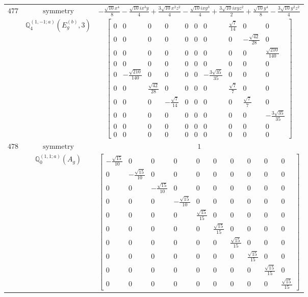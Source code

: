 \documentclass[fleqn,8pt,landscape]{jsarticle}
\begin{document}
\begin{longtable}{ccc}
$ 477 $ & $ \text{symmetry} $ & $ - \frac{\sqrt{10} x^{4}}{8} - \frac{\sqrt{10} i x^{3} y}{4} + \frac{3 \sqrt{10} x^{2} z^{2}}{4} - \frac{\sqrt{10} i x y^{3}}{4} + \frac{3 \sqrt{10} i x y z^{2}}{2} + \frac{\sqrt{10} y^{4}}{8} - \frac{3 \sqrt{10} y^{2} z^{2}}{4} $ \\
$  $ & $ \mathbb{Q}_{4}^{(1,-1;a)}(E_{g}^{(b)},3) $ & $ \begin{bmatrix} 0 & 0 & 0 & 0 & 0 & 0 & 0 & \frac{\sqrt{7}}{14} & 0 & 0 \\ 0 & 0 & 0 & 0 & 0 & 0 & 0 & 0 & - \frac{\sqrt{42}}{28} & 0 \\ 0 & 0 & 0 & 0 & 0 & 0 & 0 & 0 & 0 & \frac{\sqrt{210}}{140} \\ 0 & 0 & 0 & 0 & 0 & 0 & 0 & 0 & 0 & 0 \\ 0 & - \frac{\sqrt{210}}{140} & 0 & 0 & 0 & 0 & - \frac{3 \sqrt{35}}{35} & 0 & 0 & 0 \\ 0 & 0 & \frac{\sqrt{42}}{28} & 0 & 0 & 0 & 0 & \frac{\sqrt{7}}{7} & 0 & 0 \\ 0 & 0 & 0 & - \frac{\sqrt{7}}{14} & 0 & 0 & 0 & 0 & \frac{\sqrt{7}}{7} & 0 \\ 0 & 0 & 0 & 0 & 0 & 0 & 0 & 0 & 0 & - \frac{3 \sqrt{35}}{35} \\ 0 & 0 & 0 & 0 & 0 & 0 & 0 & 0 & 0 & 0 \\ 0 & 0 & 0 & 0 & 0 & 0 & 0 & 0 & 0 & 0 \end{bmatrix} $ \\ \hline
$ 478 $ & $ \text{symmetry} $ & $ 1 $ \\
$  $ & $ \mathbb{Q}_{0}^{(1,1;a)}(A_{g}) $ & $ \begin{bmatrix} - \frac{\sqrt{15}}{10} & 0 & 0 & 0 & 0 & 0 & 0 & 0 & 0 & 0 \\ 0 & - \frac{\sqrt{15}}{10} & 0 & 0 & 0 & 0 & 0 & 0 & 0 & 0 \\ 0 & 0 & - \frac{\sqrt{15}}{10} & 0 & 0 & 0 & 0 & 0 & 0 & 0 \\ 0 & 0 & 0 & - \frac{\sqrt{15}}{10} & 0 & 0 & 0 & 0 & 0 & 0 \\ 0 & 0 & 0 & 0 & \frac{\sqrt{15}}{15} & 0 & 0 & 0 & 0 & 0 \\ 0 & 0 & 0 & 0 & 0 & \frac{\sqrt{15}}{15} & 0 & 0 & 0 & 0 \\ 0 & 0 & 0 & 0 & 0 & 0 & \frac{\sqrt{15}}{15} & 0 & 0 & 0 \\ 0 & 0 & 0 & 0 & 0 & 0 & 0 & \frac{\sqrt{15}}{15} & 0 & 0 \\ 0 & 0 & 0 & 0 & 0 & 0 & 0 & 0 & \frac{\sqrt{15}}{15} & 0 \\ 0 & 0 & 0 & 0 & 0 & 0 & 0 & 0 & 0 & \frac{\sqrt{15}}{15} \end{bmatrix} $ \\ \hline

\end{longtable}
\end{document}
